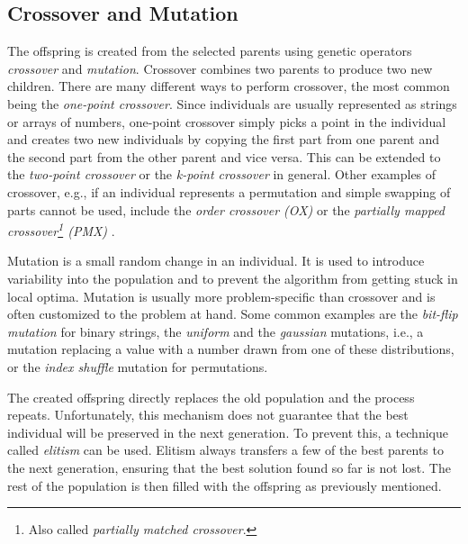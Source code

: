 \subsection{Crossover and Mutation}

The offspring is created from the selected parents using genetic operators \textit{crossover} and \textit{mutation}. Crossover combines two parents to produce two new children. There are many different ways to perform crossover, the most common being the \textit{one-point crossover}. Since individuals are usually represented as strings or arrays of numbers, one-point crossover simply picks a point in the individual and creates two new individuals by copying the first part from one parent and the second part from the other parent and vice versa. This can be extended to the \textit{two-point crossover} or the \textit{k-point crossover} in general. Other examples of crossover, e.g., if an individual represents a permutation and simple swapping of parts cannot be used, include the \textit{order crossover (OX)} or the \textit{partially mapped crossover\footnote{Also called \textit{partially matched crossover}.} (PMX)} \cite{vanneschi2023lectures}.

Mutation is a small random change in an individual. It is used to introduce variability into the population and to prevent the algorithm from getting stuck in local optima. Mutation is usually more problem-specific than crossover and is often customized to the problem at hand. Some common examples are the \textit{bit-flip mutation} for binary strings, the \textit{uniform} and the \textit{gaussian} mutations, i.e., a mutation replacing a value with a number drawn from one of these distributions, or the \textit{index shuffle} mutation for permutations.

\bigskip

The created offspring directly replaces the old population and the process repeats. Unfortunately, this mechanism does not guarantee that the best individual will be preserved in the next generation. To prevent this, a technique called \textit{elitism} can be used. Elitism always transfers a few of the best parents to the next generation, ensuring that the best solution found so far is not lost. The rest of the population is then filled with the offspring as previously mentioned.


